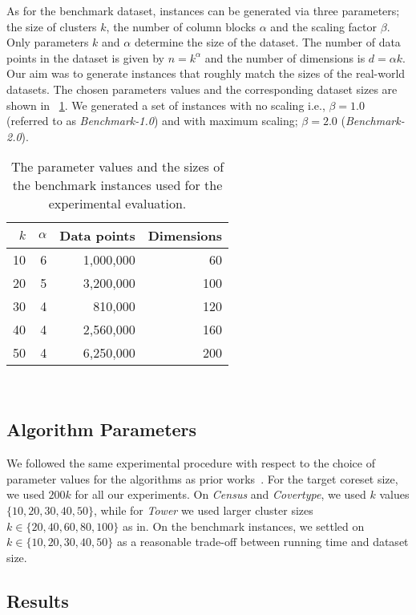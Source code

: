 As for the benchmark dataset, instances can be generated via three parameters; the size of clusters $k$, the number of column blocks $\alpha$ and the scaling factor $\beta$. Only parameters $k$ and $\alpha$ determine the size of the dataset. The number of data points in the dataset is given by $n=k^{\alpha}$ and the number of dimensions is $d=\alpha k$. Our aim was to generate instances that roughly match the sizes of the real-world datasets. The chosen parameters values and the corresponding dataset sizes are shown in ~\cref{tab:benchmark-instances-overview}. We generated a set of instances with no scaling i.e., $\beta=1.0$ (referred to as \textit{Benchmark-1.0}) and with maximum scaling; $\beta = 2.0$ (\textit{Benchmark-2.0}).



%
\begin{table}
	\begin{center}%
	\caption{The parameter values and the sizes of the benchmark instances used for the experimental evaluation.}
	\label{tab:benchmark-instances-overview}
	\begin{tabular}{rrrr}
		\toprule
        $k$
		    & $\alpha$
		    & Data points
		    & Dimensions
            \\
		\midrule
        10
    		& 6
    		& 1,000,000
    		& 60
    		\\
        20
    		& 5
    		& 3,200,000
    		& 100
    		\\
        30
    		& 4
    		& 810,000
    		& 120
    		\\
        40
    		& 4
    		& 2,560,000
    		& 160
    		\\
        50
    		& 4
    		& 6,250,000
    		& 200
    		\\
		\bottomrule
	\end{tabular}\\
	\end{center}
\end{table}

\subsection{Algorithm Parameters}
We followed the same experimental procedure with respect to the choice of parameter values for the algorithms as prior works~\cite{FGSSS13, AckermannMRSLS12}. For the target coreset size, we used $200k$ for all our experiments. On \textit{Census} and \textit{Covertype}, we used $k$ values $\{10, 20, 30, 40, 50\}$, while for \textit{Tower} we used larger cluster sizes $k \in \{20, 40, 60, 80, 100\}$ as in. On the benchmark instances, we settled on $k \in \{10, 20, 30, 40, 50\}$ as a reasonable trade-off between running time and dataset size.



\subsection{Results}


